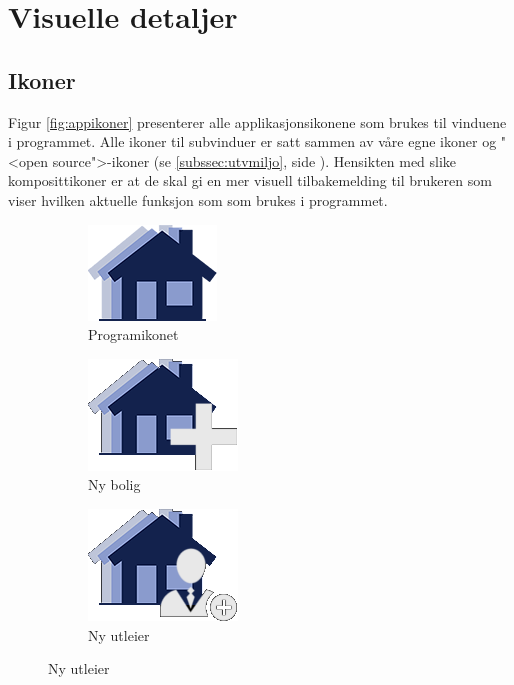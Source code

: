 \section{Visuelle detaljer}


\subsection{Ikoner}
Figur \ref{fig:appikoner} presenterer alle applikasjonsikonene som brukes til vinduene i programmet. Alle ikoner til subvinduer er satt sammen av våre egne ikoner og "<open source">-ikoner (se \ref{subssec:utvmiljo}, side \pageref{subssec:utvmiljo}). Hensikten med slike komposittikoner er at de skal gi en mer visuell tilbakemelding til brukeren som viser hvilken aktuelle funksjon som som brukes i programmet. 

\begin{figure}[ht!]
\centering
\begin{subfigure}[b]{0.2\textwidth}
\centering
\includegraphics[scale=0.4]{./img/produktdokumentasjon/visuelle_detaljer/boligLogo.png}
\caption{Programikonet}
\end{subfigure}
\quad
\begin{subfigure}[b]{0.2\textwidth}
\centering
\includegraphics[scale=0.4]{./img/produktdokumentasjon/visuelle_detaljer/ny_bolig.png}
\caption{Ny bolig}
\end{subfigure}
\quad
\begin{subfigure}[b]{0.2\textwidth}
\centering
\includegraphics[scale=0.4]{./img/produktdokumentasjon/visuelle_detaljer/ny_utleier.png}
\caption{Ny utleier}

\end{subfigure}
\end{figure}

